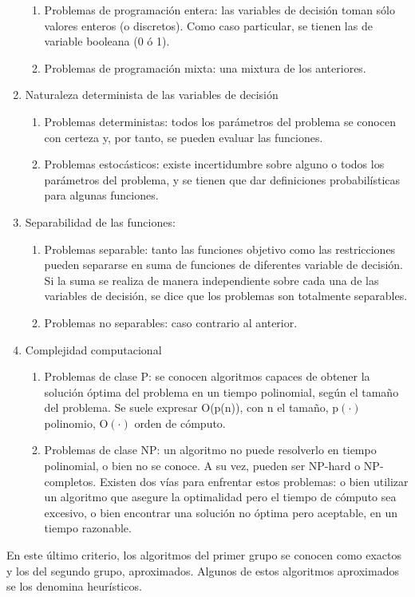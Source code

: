 \begin{enumerate}
\begin{enumerate}
            \item Problemas de programación entera: las variables de decisión toman sólo valores enteros (o discretos). Como caso particular, se tienen las de variable booleana (0 ó 1).
            \item Problemas de programación mixta: una mixtura de los anteriores.
        \end{enumerate}
    \item Naturaleza determinista de las variables de decisión
        \begin{enumerate}
            \item Problemas deterministas: todos los parámetros del problema se conocen con certeza y, por tanto, se pueden evaluar las funciones.
            \item Problemas estocásticos: existe incertidumbre sobre alguno o todos los parámetros del problema, y se tienen que dar definiciones probabilísticas para algunas funciones.
        \end{enumerate}
    \item Separabilidad de las funciones:
        \begin{enumerate}
            \item Problemas separable: tanto las funciones objetivo como las restricciones pueden separarse en suma de funciones de diferentes variable de decisión. Si la suma se realiza de manera independiente sobre cada una de las variables de decisión, se dice que los problemas son totalmente separables.
            \item Problemas no separables: caso contrario al anterior.
        \end{enumerate}
    \item Complejidad computacional
        \begin{enumerate}
            \item Problemas de clase P: se conocen algoritmos capaces de obtener la solución óptima del problema en un tiempo polinomial, según el tamaño del problema. Se suele expresar O(p(n)), con n el tamaño, p$(\cdot)$ polinomio, O$(\cdot)$ orden de cómputo.
            \item Problemas de clase NP: un algoritmo no puede resolverlo en tiempo polinomial, o bien no se conoce. A su vez, pueden ser NP-hard o NP-completos. Existen dos vías para enfrentar estos problemas: o bien utilizar un algoritmo que asegure la optimalidad pero el tiempo de cómputo sea excesivo, o bien encontrar una solución no óptima pero aceptable, en un tiempo razonable.
        \end{enumerate}
\end{enumerate}
En este último criterio, los algoritmos del primer grupo se conocen como exactos y los del segundo grupo, aproximados. Algunos de estos algoritmos aproximados se los denomina heurísticos.

